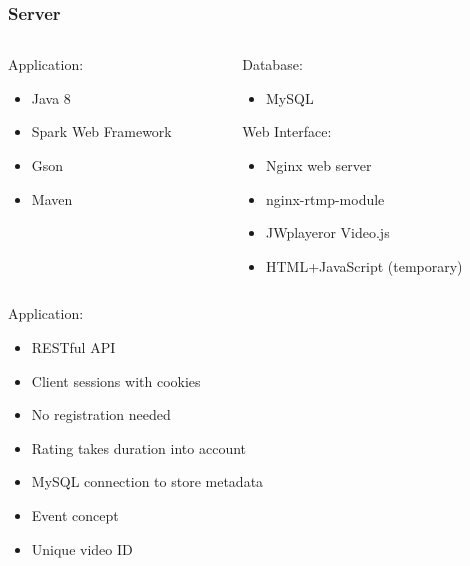 \begin{frame}	
	\frametitle{Server}
	\begin{columns}[t]
		\begin{column}[t]{0.5\linewidth}
			Application:
			\begin{itemize}
				\item Java 8
				\item Spark Web Framework\footnotemark[1]
				\item Gson\footnotemark[2]
				\item Maven\footnotemark[3]
			\end{itemize}
		\end{column}
		\begin{column}[t]{0.5\linewidth}
			Database:
			\begin{itemize}
				\item MySQL
			\end{itemize}
			
			Web Interface:
			\begin{itemize}
				\item Nginx web server\footnotemark[4]
				\item nginx-rtmp-module\footnotemark[5]
				\item JWplayer\footnotemark[6] or Video.js\footnotemark[7]
				\item HTML+JavaScript (temporary)
			\end{itemize}
		\end{column}		
	\end{columns}	
	
{\tiny
}
\end{frame}

\begin{frame}	
			Application:
			\begin{itemize}
				\item RESTful API
				\item Client sessions with cookies
				\item No registration needed
				\item Rating takes duration into account
				\item MySQL connection to store metadata
				\item Event concept
				\item Unique video ID
			\end{itemize}
\end{frame}

